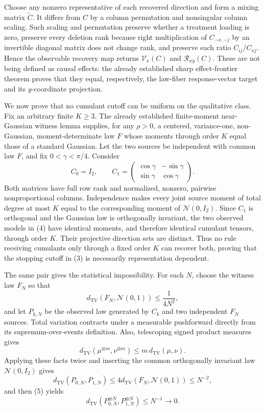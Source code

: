 Choose any nonzero representative of each recovered direction and form a mixing matrix \(\widetilde C\). It differs from \(C\) by a column permutation and nonsingular column scaling. Such scaling and permutation preserve whether a treatment loading is zero, preserve every deletion rank because right multiplication of \(C_{-x,-j}\) by an invertible diagonal matrix does not change rank, and preserve each ratio \(C_{ij}/C_{xj}\). Hence the observable recovery map returns \(\mathcal V_x(C)\) and \(\mathcal R_{xy}(C)\). These are not being defined as causal effects: the already established sharp effect-frontier theorem proves that they equal, respectively, the law-fiber response-vector target and its \(y\)-coordinate projection.

We now prove that no cumulant cutoff can be uniform on the qualitative class. Fix an arbitrary finite \(K\ge3\). The already established finite-moment near-Gaussian witness lemma supplies, for any \(\rho>0\), a centered, variance-one, non-Gaussian, moment-determinate law \(F\) whose moments through order \(K\) equal those of a standard Gaussian. Let the two sources be independent with common law \(F\), and fix \(0<\gamma<\pi/4\). Consider
\[
 C_0=I_2,
 \qquad
 C_1=
 \begin{pmatrix}
 \cos\gamma&-\sin\gamma\\
 \sin\gamma&\cos\gamma
 \end{pmatrix}.
 \tag{4}
\]
Both matrices have full row rank and normalized, nonzero, pairwise nonproportional columns. Independence makes every joint source moment of total degree at most \(K\) equal to the corresponding moment of \(\mathcal N(0,I_2)\). Since \(C_1\) is orthogonal and the Gaussian law is orthogonally invariant, the two observed models in (4) have identical moments, and therefore identical cumulant tensors, through order \(K\). Their projective direction sets are distinct. Thus no rule receiving cumulants only through a fixed order \(K\) can recover both, proving that the stopping cutoff in (3) is necessarily representation dependent.

The same pair gives the statistical impossibility. For each \(N\), choose the witness law \(F_N\) so that
\[
 d_{\mathrm{TV}}(F_N,\mathcal N(0,1))\le\frac1{4N^2},
\]
and let \(P_{k,N}\) be the observed law generated by \(C_k\) and two independent \(F_N\) sources. Total variation contracts under a measurable pushforward directly from its supremum-over-events definition. Also, telescoping signed product measures gives
\[
 d_{\mathrm{TV}}(\mu^{\otimes m},\nu^{\otimes m})
 \le m\,d_{\mathrm{TV}}(\mu,\nu).
 \tag{5}
\]
Applying these facts twice and inserting the common orthogonally invariant law \(\mathcal N(0,I_2)\) gives
\[
 d_{\mathrm{TV}}(P_{0,N},P_{1,N})
 \le4d_{\mathrm{TV}}(F_N,\mathcal N(0,1))
 \le N^{-2},
\]
and then (5) yields
\[
 d_{\mathrm{TV}}(P_{0,N}^{\otimes N},P_{1,N}^{\otimes N})
 \le N^{-1}\longrightarrow0.
 \tag{6}
\]

